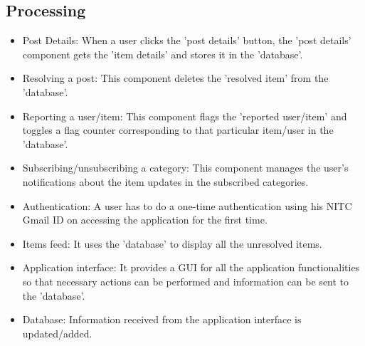 \documentclass[a4paper,12pt]{article}
\begin{document}
\subsection{Processing}
\begin{itemize}
\item Post Details: When a user clicks the 'post details' button, the 'post details' component gets the 'item details' and stores it in the 'database'.
\item Resolving a post: This component deletes the 'resolved item' from the 'database'. 
\item Reporting a user/item: This component flags the 'reported user/item' and toggles a flag counter corresponding to that particular item/user in the 'database'. 
\item Subscribing/unsubscribing a category: This component manages the user's notifications about the item updates in the subscribed categories. 
\item Authentication: A user has to do a one-time authentication using his NITC Gmail ID on accessing the application for the first time. 
\item Items feed: It uses the 'database' to display all the unresolved items. 
\item Application interface: It provides a GUI for all the application functionalities so that necessary actions can be performed and information can be sent to the 'database'. 
\item Database: Information received from the application interface is updated/added.
\end{itemize}
\end{document}
